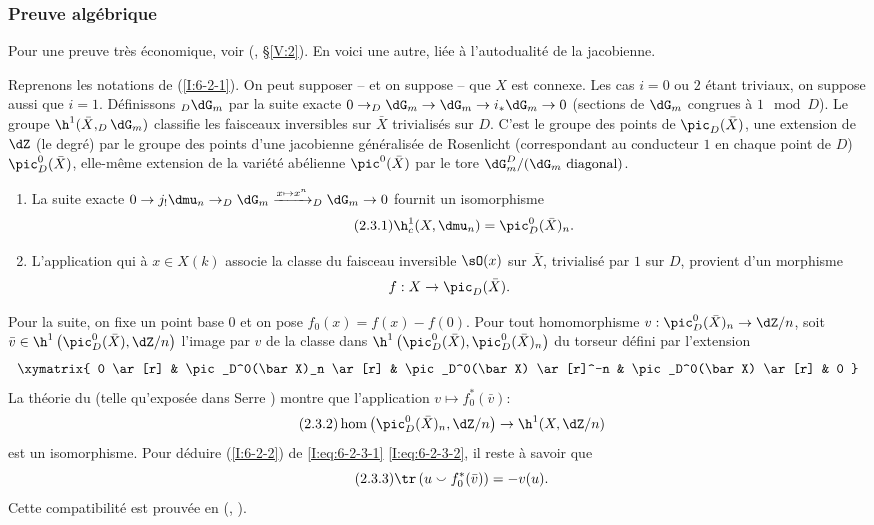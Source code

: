 \subsubsection{Preuve algébrique}\label{I:6-2-3}

Pour une preuve très économique, voir (, \S\ref{V:2}). 
En voici une autre, liée à l'autodualité de la jacobienne. 

Reprenons les notations de (\ref{I:6-2-1}). On peut supposer -- et on suppose -- 
que $X$ est connexe. Les cas $i=0$ ou $2$ étant triviaux, on suppose aussi 
que $i=1$. Définissons $_D\dG_m$ par la suite exacte 
$0\to _D\dG_m \to \dG_m \to i_*\dG_m\to 0$ (sections de $\dG_m$ congrues à 
$1\mod D$). Le groupe $\h^1(\bar X, _D\dG_m)$ classifie les faisceaux 
inversibles sur $\bar X$ trivialisés sur $D$. C'est le groupe des points de 
$\pic_D(\bar X)$, une extension de $\dZ$ (le degré) par le groupe des points 
d'une jacobienne généralisée de Rosenlicht (correspondant au conducteur 
$1$ en chaque point de $D$) $\pic_D^0(\bar X)$, elle-même extension de la 
variété abélienne $\pic^0(\bar X)$ par le tore 
$\dG_m^D/(\text{$\dG_m$ diagonal})$. 

\begin{enumerate}[\indent a)]
  \item {}La suite exacte 
    $0\to j_!\dmu_n \to _D\dG_m \xrightarrow{x\mapsto x^n} _D\dG_m\to 0$ fournit un 
    isomorphisme 
    \begin{equation*}\tag{2.3.1}\label{I:eq:6-2-3-1}
      \h_c^1(X,\dmu_n) = \pic_D^0(\bar X)_n \text{.}
    \end{equation*}
  \item L'application qui à $x\in X(k)$ associe la classe du faisceau 
    inversible $\sO(x)$ sur $\bar X$, trivialisé par $1$ sur $D$, provient 
    d'un morphisme 
    \[
      f:X \to \pic_D(\bar X) \text{.}
    \]
\end{enumerate}
Pour la suite, on fixe un point base $0$ et on pose $f_0(x)=f(x)-f(0)$. Pour 
tout homomorphisme $v:\pic_D^0(\bar X)_n \to \dZ/n$, soit 
$\bar v\in \h^1\left(\pic_D^0(\bar X),\dZ/n\right)$ l'image par $v$ de la classe 
dans $\h^1\left(\pic_D^0(\bar X),\pic_D^0(\bar X)_n\right)$ du torseur défini 
par l'extension 
\[\xymatrix{
  0 \ar[r] 
    & \pic_D^0(\bar X)_n \ar[r] 
    & \pic_D^0(\bar X) \ar[r]^-n 
    & \pic_D^0(\bar X) \ar[r] 
    & 0
}\]
La théorie du  (telle qu'exposée dans 
Serre \cite{se59}) montre que l'application $v\mapsto f_0^*(\bar v)$: 
\begin{equation*}\tag{2.3.2}\label{I:eq:6-2-3-2}
  \hom\left(\pic_D^0(\bar X)_n,\dZ/n\right) \to \h^1(X,\dZ/n)
\end{equation*}
est un isomorphisme. Pour déduire (\ref{I:6-2-2}) de \eqref{I:eq:6-2-3-1} 
\eqref{I:eq:6-2-3-2}, il reste à savoir que 
\begin{equation*}\tag{2.3.3}\label{I:eq:6-2-3-3}
  \tr\left(u \smallsmile f_0^*(\bar v)\right) = -v(u) \text{.}
\end{equation*}
Cette compatibilité est prouvée en (, ).

